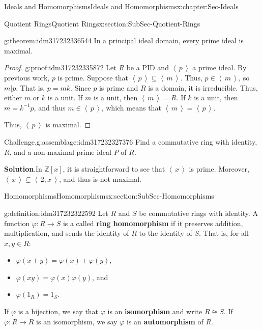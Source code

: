 \documentclass[oneside,10pt,]{book}
\newcommand{\blocktitlefont}{\relax}
\newcommand{\terminology}[1]{\textbf{#1}}
\numberwithin{equation}{section}
\newcommand{\ideal}[1]{\left\langle\, #1 \,\right\rangle}
\def\p{\varphi}
\def\Z{{\mathbb Z}}
\begin{document}
\begin{chapterptx}{Ideals and Homomorphisms}{}{Ideals and Homomorphisms}{}{}{x:chapter:Sec-Ideals}
\begin{sectionptx}{Quotient Rings}{}{Quotient Rings}{}{}{x:section:SubSec-Quotient-Rings}
\begin{theorem}{}{}{g:theorem:idm317232336544}%
In a principal ideal domain, every prime ideal is maximal.%
\end{theorem}
\begin{proof}{}{g:proof:idm317232335872}
Let \(R\) be a PID and \(\ideal{p}\) a prime ideal. By previous work, \(p\) is prime. Suppose that \(\ideal{p} \subseteq \ideal{m}\). Thus, \(p\in \ideal{m}\), so \(m|p\). That is, \(p = mk\). Since \(p\) is prime and \(R\) is a domain, it is irreducible. Thus, either \(m\) or \(k\) is a unit. If \(m\) is a unit, then \(\ideal{m} = R\). If \(k\) is a unit, then \(m = k^{-1} p\), and thus \(m\in \ideal{p}\), which means that \(\ideal{m} = \ideal{p}\).%
\par
Thus, \(\ideal{p}\) is maximal.%
\end{proof}
\begin{assemblage}{Challenge.}{g:assemblage:idm317232327376}%
Find a commutative ring with identity, \(R\), and a non-maximal prime ideal \(P\) of \(R\).%
\end{assemblage}
\textbf{\blocktitlefont Solution}.\quad{}In \(\Z[x]\), it is straightforward to see that \(\ideal{x}\) is prime. Moreover, \(\ideal{x}\subsetneq \ideal{2,x}\), and thus is not maximal.%
\end{sectionptx}
%
%
\typeout{************************************************}
\typeout{************************************************}
%
\begin{sectionptx}{Homomorphisms}{}{Homomorphisms}{}{}{x:section:SubSec-Homomorphisms}
\begin{definition}{}{g:definition:idm317232322592}%
Let \(R\) and \(S\) be commutative rings with identity. A function \(\p : R\to S\) is a called \terminology{ring homomorphism} if it preserves addition, multiplication, and sends the identity of \(R\) to the identity of \(S\). That is, for all \(x,y\in R\):%
\begin{itemize}[label=\textbullet]
\item{}\(\p(x+y) = \p(x) + \p(y)\),%
\item{}\(\p(xy) = \p(x)\p(y)\), and%
\item{}\(\p(1_R) = 1_S\).%
\end{itemize}
If \(\p\) is a bijection, we say that \(\p\) is an \terminology{isomorphism} and write \(R\cong S\). If \(\p : R\to R\) is an isomorphism, we say \(\p\) is an \terminology{automorphism} of \(R\).%
\end{definition}

\end{sectionptx}
\end{chapterptx}
\end{document}
